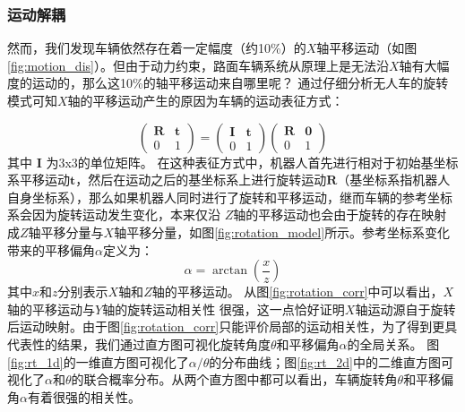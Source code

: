 \subsubsection{运动解耦}
然而，我们发现车辆依然存在着一定幅度（约10\%）的$X$轴平移运动（如图\ref{fig:motion_dis}）。但由于动力约束，路面车辆系统从原理上是无法沿$X$轴有大幅度的运动的，那么这10\%的轴平移运动来自哪里呢？
通过仔细分析无人车的旋转模式可知$X$轴的平移运动产生的原因为车辆的运动表征方式：

\begin{equation}
    \begin{pmatrix} \mathbf{R} & \mathbf{t}\\ 0 & 1  \end{pmatrix} = \begin{pmatrix} \mathbf{I}& \mathbf{t}\\ 0 & 1  \end{pmatrix}\begin{pmatrix} \mathbf{R}& \mathbf{0}\\ 0 & 1  \end{pmatrix}
    \label{eq:ftlr}
\end{equation}
其中
$\mathbf{I}$ 为3x3的单位矩阵。 
在这种表征方式中，机器人首先进行相对于初始基坐标系平移运动$\mathbf{t}$，然后在运动之后的基坐标系上进行旋转运动$\mathbf{R}$（基坐标系指机器人自身坐标系）\cite{sun1995robot}，那么如果机器人同时进行了旋转和平移运动，继而车辆的参考坐标系会因为旋转运动发生变化，本来仅沿
$Z$轴的平移运动也会由于旋转的存在映射成$Z$轴平移分量与$X$轴平移分量，如图\ref{fig:rotation_model}所示。参考坐标系变化带来的平移偏角$\alpha$定义为：
\begin{equation}
    \alpha = \arctan\left(\frac{x}{z}\right)
\end{equation}
其中$x$和$z$分别表示$X$轴和$Z$轴的平移运动。
从图\ref{fig:rotation_corr}中可以看出，$X$轴的平移运动与$Y$轴的旋转运动相关性
很强，这一点恰好证明$X$轴运动源自于旋转后运动映射。由于图\ref{fig:rotation_corr}只能评价局部的运动相关性，为了得到更具代表性的结果，我们通过直方图可视化旋转角度$\theta$和平移偏角$\alpha$的全局关系。 图\ref{fig:rt_1d}的一维直方图可视化了$\alpha/\theta$的分布曲线；图\ref{fig:rt_2d}中的二维直方图可视化了$\alpha$和$\theta$的联合概率分布。从两个直方图中都可以看出，车辆旋转角$\theta$和平移偏角$\alpha$有着很强的相关性。

